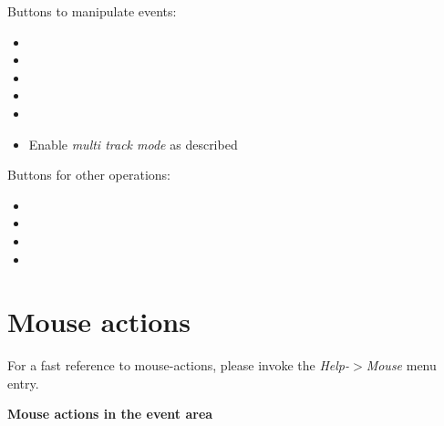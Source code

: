 \documentclass[letterpaper]{report}
\begin{document}
Buttons to manipulate events:
\begin{itemize}
\item {}
\item {}
\item {}
\item {}
\item {}
\item Enable {\em multi track mode} as described 
\end{itemize}

Buttons for other operations:
\begin{itemize}
\item {}
\item {}
\item {}
\item {}
\end{itemize}



\section{Mouse actions}\label{mouseact}

For a fast reference to mouse-actions, please invoke the {\em Help-$>$Mouse}
menu entry.

{\bf Mouse actions in the event area}
\end{document}
